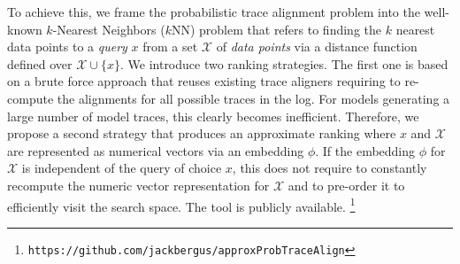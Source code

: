 To achieve this, we frame the probabilistic trace alignment problem into the well-known $k$-Nearest Neighbors ($k$NN) problem \cite{Altman} that refers to finding the $k$ nearest data points to a \textit{query} $x$ from a set $\mathcal{X}$ of \textit{data points} via a distance function defined over $\mathcal{X}\cup\{x\}$.
We introduce two ranking strategies. The first one is based on a brute force approach that reuses existing trace aligners  \cite{LeoniM17} %
requiring to re-compute the alignments for all possible traces in the log. For models generating a large number of model traces, this clearly becomes inefficient. Therefore, we propose a second strategy that produces an approximate ranking where $x$ and $\mathcal{X}$ are represented as numerical vectors via an embedding $\phi$.
If the embedding $\phi$ for $\mathcal{X}$ is independent of the query of choice $x$, this does not require to constantly recompute the numeric vector representation for $\mathcal{X}$ and to pre-order it to efficiently visit the search space. The tool is publicly available.
\footnote{\texttt{https://github.com/jackbergus/approxProbTraceAlign}}

